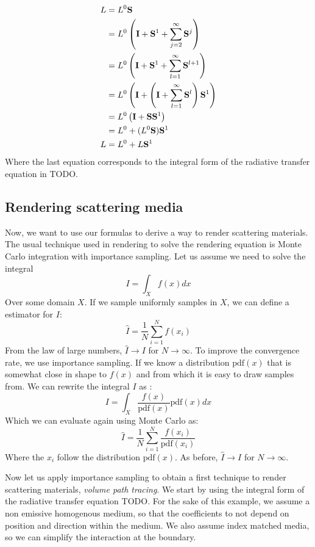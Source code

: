 \begin{equation*}
\begin{split}
L &= L^0 \mathbf{S} \\
&= L^0 \left(\mathbf{I} + \mathbf{S}^1 + \sum_{j=2}^\infty \mathbf{S}^j \right) \\
&= L^0 \left( \mathbf{I} + \mathbf{S}^1 + \sum_{l=1}^\infty \mathbf{S}^{l+1} \right) \\
&= L^0 \left( \mathbf{I} + \left( \mathbf{I} + \sum_{l=1}^\infty \mathbf{S}^l \right) \mathbf{S}^1 \right)  \\
&= L^0 \left( \mathbf{I} + \mathbf{S} \mathbf{S}^1 \right)  \\
&= L^0 + (L^0 \mathbf{S}) \mathbf{S}^1   \\
L &= L^0 + L \mathbf{S}^1   \\
\end{split}
\end{equation*}
Where the last equation corresponds to the integral form of the radiative transfer equation in TODO.

\subsection{Rendering scattering media}


Now, we want to use our formulas to derive a way to render scattering materials. The usual technique used in rendering to solve the rendering equation is Monte Carlo integration with importance sampling. Let us assume we need to solve the integral
$$
I = \int_X f(x) dx
$$
Over some domain $X$. If we sample uniformly samples in $X$, we can define a estimator for $I$:
$$
\hat{I} = \frac{1}{N} \sum_{i=1}^N f(x_i)
$$
From the law of large numbers, $\hat{I} \rightarrow I$ for $N \rightarrow \infty$. To improve the convergence rate, we use importance sampling. If we know a distribution $\text{pdf}(x)$ that is somewhat close in shape to $f(x)$ and from which it is easy to draw samples from. We can rewrite the integral $I$ as :
$$
I = \int_X \frac{f(x)}{\text{pdf}(x)} \text{pdf}(x) dx
$$
Which we can evaluate again using Monte Carlo as:
$$
\hat{I} = \frac{1}{N} \sum_{i=1}^N \frac{f(x_i)}{\text{pdf}(x_i)}
$$
Where the $x_i$ follow the distribution $\text{pdf}(x)$. As before, $\hat{I} \rightarrow I$ for $N \rightarrow \infty$.

Now let us apply importance sampling to obtain a first technique to render scattering materials,  \emph{volume path tracing}. We start by using the integral form of the radiative transfer equation TODO. For the sake of this example, we assume a non emissive homogenous medium, so that the coefficients to not depend on position and direction within the medium. We also assume index matched media, so we can simplify the interaction at the boundary. 

